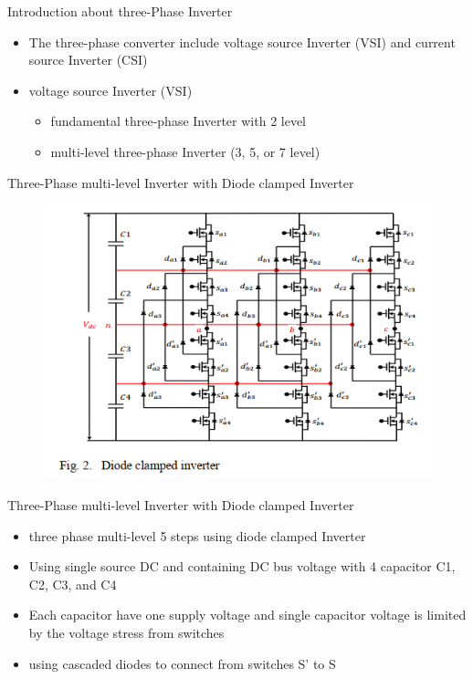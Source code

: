 \documentclass[
	11pt, %
]{beamer}
\begin{document}
\begin{frame}{Introduction about three-Phase Inverter}
	\begin{itemize}
		\setlength{\itemsep}{10pt}
		\item {The three-phase converter include voltage source Inverter (VSI) and current source Inverter (CSI)}
		\item {voltage source Inverter (VSI)}
		\begin{itemize}
			\setlength{\itemsep}{10pt}
			\item {fundamental three-phase Inverter with 2 level}
			\item {multi-level three-phase Inverter (3, 5, or 7 level)}
		\end{itemize}
	\end{itemize}
\end{frame}

\begin{frame}{Three-Phase multi-level Inverter with Diode clamped Inverter}
	\begin{figure}
		\includegraphics[width=0.7\linewidth]{diodeClamped.png}
	\end{figure}
\end{frame}

\begin{frame}{Three-Phase multi-level Inverter with Diode clamped Inverter}
	\begin{itemize}
		\setlength{\itemsep}{10pt}
		\item {three phase multi-level 5 steps using diode clamped Inverter}
		\item {Using single source DC and containing DC bus voltage with 4 capacitor C1, C2, C3, and C4}
		\item {Each capacitor have one supply voltage and single capacitor voltage is limited by the voltage stress from switches}
		\item {using cascaded diodes to connect from switches S' to S}
	\end{itemize}
\end{frame}
\end{document}
